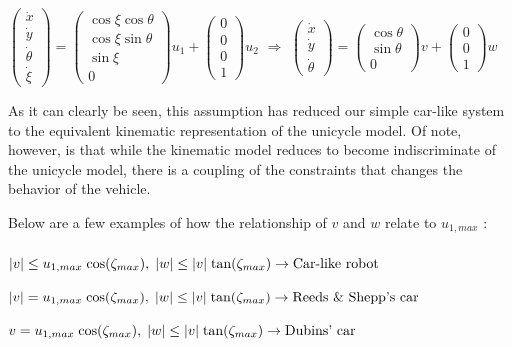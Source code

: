 \documentclass[twoside]{article}
\begin{document}
\begin{center}
$
\begin{pmatrix}
\dot{x} \\ \dot{y} \\ \dot{\theta} \\ \dot{\xi}
\end{pmatrix} =
\begin{pmatrix} \cos \xi \cos \theta \\ \cos \xi \sin \theta \\ \sin \xi \\ 0 \end{pmatrix} u_1 + \begin{pmatrix} 0 \\ 0 \\ 0 \\ 1 \end{pmatrix} u_2
$ $\Rightarrow$ $
\begin{pmatrix}
\dot{x} \\ \dot{y} \\ \dot{\theta}
\end{pmatrix} =
\begin{pmatrix} \cos \theta \\ \sin \theta \\ 0 \end{pmatrix} v + \begin{pmatrix} 0 \\ 0 \\ 1 \end{pmatrix} w
$
\end{center}

As it can clearly be seen, this assumption has reduced our simple car-like system to the equivalent kinematic representation of the unicycle model. Of note, however, is that while the kinematic model reduces to become indiscriminate of the unicycle model, there is a coupling of the constraints that changes the behavior of the vehicle.

Below are a few examples of how the relationship of $v$ and $w$ relate to $u_{1,max}$ \cite{jp}:
\\\\
$
|v| \leq u_{1,max}\;\textup{cos}(\zeta_{max}),\;|w|\leq |v|\;\textup{tan}(\zeta_{max}) \rightarrow \textup{Car-like robot}
$

$
|v|= u_{1,max}\;\textup{cos}(\zeta_{max}),\;|w|\leq |v|\;\textup{tan}(\zeta_{max}) \rightarrow \textup{Reeds \& Shepp's car}
$

$
v= u_{1,max}\;\textup{cos}(\zeta_{max}),\;|w|\leq |v|\;\textup{tan}(\zeta_{max}) \rightarrow \textup{Dubins' car}
$
\end{document}
